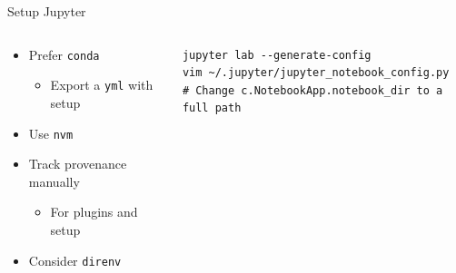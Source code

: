 \documentclass[bigger,unknownkeysallowed,aspectratio=169,red,colorblocks]{beamer}
\begin{document}
\begin{frame}[label={sec:org8a7697a},fragile]{Setup Jupyter}
 \begin{columns}
\begin{column}{0.4\columnwidth}
\begin{itemize}
\item Prefer \texttt{conda}
\begin{itemize}
\item Export a \texttt{yml} with setup
\end{itemize}
\item Use \texttt{nvm}
\item Track provenance manually
\begin{itemize}
\item For plugins and setup
\end{itemize}
\item Consider \texttt{direnv}
\end{itemize}
\end{column}
\begin{column}{0.6\columnwidth}
\begin{verbatim}
jupyter lab --generate-config
vim ~/.jupyter/jupyter_notebook_config.py
# Change c.NotebookApp.notebook_dir to a full path
\end{verbatim}
\end{column}
\end{columns}
\end{frame}
\end{document}
